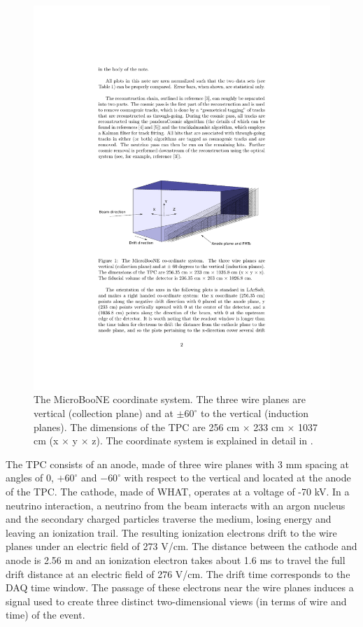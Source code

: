 \documentclass[a4paper,11pt]{article}
\begin{document}
\begin{figure}[htbp]
  \begin{center}
    \includegraphics[width=0.8\linewidth]{figures/coord.pdf}

    \caption{The MicroBooNE coordinate system. The three wire planes are vertical (collection plane) and at  $\pm60^{\circ}$ to the vertical (induction planes). The dimensions of the TPC are 256 cm $\times$ 233 cm $\times$ 1037 cm (x $\times$ y $\times$ z). The coordinate system is explained in detail in \cite{mcdata}.} \label{fig:coord}
  \end{center}
\end{figure}

The TPC consists of an anode, made of three wire planes with 3 mm spacing at angles of 0,  $+60^{\circ}$ and  $-60^{\circ}$ with respect to the vertical and located at the anode of the TPC. The cathode, made of WHAT, operates at a voltage of -70 kV. In a neutrino interaction, a neutrino from the beam interacts with an argon nucleus and the secondary charged particles traverse the medium, losing energy and leaving an ionization trail. The resulting ionization electrons drift to the wire planes under an electric field of 273 V/cm. The distance between the cathode and anode is 2.56 m and an ionization electron takes about 1.6 ms to travel the full drift distance at an electric field of 276 V/cm. The drift time corresponds to the DAQ time window. The passage of these electrons near the wire planes induces a signal used to create three distinct two-dimensional views (in terms of wire and time) of the event.
\end{document}
